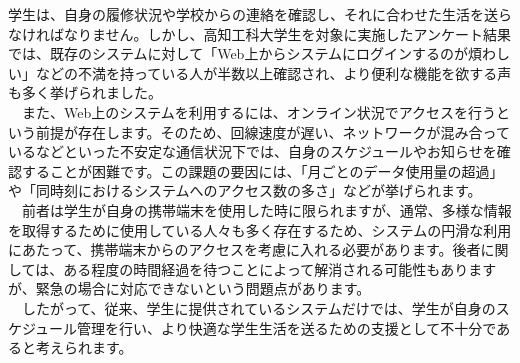 学生は、自身の履修状況や学校からの連絡を確認し、それに合わせた生活を送らなければなりません。しかし、高知工科大学生を対象に実施したアンケート結果では、既存のシステムに対して「Web上からシステムにログインするのが煩わしい」などの不満を持っている人が半数以上確認され、より便利な機能を欲する声も多く挙げられました。\\
　また、Web上のシステムを利用するには、オンライン状況でアクセスを行うという前提が存在します。そのため、回線速度が遅い、ネットワークが混み合っているなどといった不安定な通信状況下では、自身のスケジュールやお知らせを確認することが困難です。この課題の要因には、「月ごとのデータ使用量の超過」や「同時刻におけるシステムへのアクセス数の多さ」などが挙げられます。\\
　前者は学生が自身の携帯端末を使用した時に限られますが、通常、多様な情報を取得するために使用している人々も多く存在するため、システムの円滑な利用にあたって、携帯端末からのアクセスを考慮に入れる必要があります。後者に関しては、ある程度の時間経過を待つことによって解消される可能性もありますが、緊急の場合に対応できないという問題点があります。\\
　したがって、従来、学生に提供されているシステムだけでは、学生が自身のスケジュール管理を行い、より快適な学生生活を送るための支援として不十分であると考えられます。
